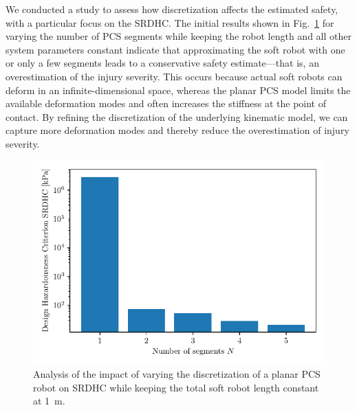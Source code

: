 We conducted a study to assess how discretization affects the estimated safety, with a particular focus on the \gls{SRDHC}. The initial results shown in Fig.~\ref{fig:safetymetric:planar_pcs_design_hazardousness_criterion_discretization} for varying the number of \gls{PCS} segments while keeping the robot length and all other system parameters constant indicate that approximating the soft robot with one or only a few segments leads to a conservative safety estimate—that is, an overestimation of the injury severity. This occurs because actual soft robots can deform in an infinite-dimensional space, whereas the planar \gls{PCS} model limits the available deformation modes and often increases the stiffness at the point of contact. By refining the discretization of the underlying kinematic model, we can capture more deformation modes and thereby reduce the overestimation of injury severity.

\begin{figure}
    \centering
    \includegraphics[width=0.5\linewidth]{safetymetric/figures/planar_pcs_design_hazardousness_criterion_discretization/design_hazardousness_criterion_bar_log.pdf}
    \caption{Analysis of the impact of varying the discretization of a planar \gls{PCS} robot on \gls{SRDHC} while keeping the total soft robot length constant at \SI{1}{m}.}
    \label{fig:safetymetric:planar_pcs_design_hazardousness_criterion_discretization}
\end{figure}